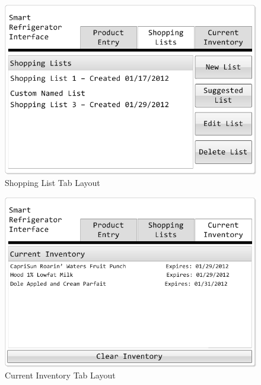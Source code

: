 \documentclass[11pt]{article} %
\begin{document}
\begin{figure}[h!]
\begin{center}
\includegraphics[scale=0.5]{../graphics/MockUp2}
\caption{Shopping List Tab Layout}
\label{mock2}
\end{center}
\end{figure}
\pagebreak
\begin{figure}[h!]
\vspace{0.5cm}
\begin{center}
\includegraphics[scale=0.5]{../graphics/MockUp3}
\caption{Current Inventory Tab Layout}
\label{mock3}
\end{center}
\end{figure}
\end{document}
